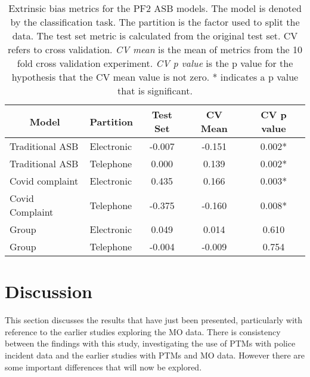 \begin{table}[]
\begin{tabular}{@{}llccc@{}}
\multicolumn{1}{c}{Model} & \multicolumn{1}{c}{Partition} & Test Set & CV Mean & CV p value \\ \midrule
Traditional ASB                                   & Electronic                                            & -0.007   & -0.151  & 0.002*      \\
Traditional ASB                                   & Telephone                                             & 0.000    & 0.139   & 0.002*      \\
Covid complaint                                   & Electronic                                            & 0.435    & 0.166   & 0.003*      \\
Covid Complaint                                   & Telephone                                             & -0.375   & -0.160  & 0.008*      \\
Group                                         & Electronic                                            & 0.049    & 0.014   & 0.610      \\
Group                                         & Telephone                                             & -0.004   & -0.009  & 0.754      \\ \bottomrule
\end{tabular}
\caption{\label{tab:asb_bias} Extrinsic bias metrics for the PF2 ASB models. The model is denoted by the classification task. The partition is the factor used to split the data. The test set metric is calculated from the original test set. CV refers to cross validation. \emph{CV mean} is the mean of metrics from the 10 fold cross validation experiment. \emph{CV p value} is the p value for the hypothesis that the CV mean value is not zero. * indicates a p value that is significant.}
\end{table}

\section{Discussion} This section discusses the results that have just been presented, particularly with reference to the earlier studies exploring the MO data.  There is consistency between the findings with this study, investigating the use of PTMs with police incident data and the earlier studies with PTMs and MO data. However there are some important differences that will now be explored.



